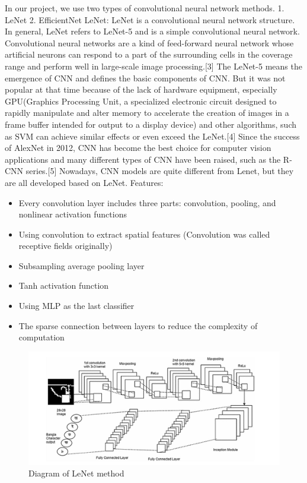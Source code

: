 \documentclass{article}
\begin{document}
In our project, we use two types of convolutional neural network methods.
1.	LeNet
2.	EfficientNet
LeNet: LeNet is a convolutional neural network structure. In general, LeNet refers to LeNet-5 and is a simple convolutional neural network. Convolutional neural networks are a kind of feed-forward neural network whose artificial neurons can respond to a part of the surrounding cells in the coverage range and perform well in large-scale image processing.[3] 
The LeNet-5 means the emergence of CNN and defines the basic components of CNN. But it was not popular at that time because of the lack of hardware equipment, especially GPU(Graphics Processing Unit, a specialized electronic circuit designed to rapidly manipulate and alter memory to accelerate the creation of images in a frame buffer intended for output to a display device) and other algorithms, such as SVM can achieve similar effects or even exceed the LeNet.[4] 
Since the success of AlexNet in 2012, CNN has become the best choice for computer vision applications and many different types of CNN have been raised, such as the R-CNN series.[5] Nowadays, CNN models are quite different from Lenet, but they are all developed based on LeNet.
Features:
\begin{itemize}
\item 	Every convolution layer includes three parts: convolution, pooling, and nonlinear activation functions
\item 	Using convolution to extract spatial features (Convolution was called receptive fields originally)
\item 	Subsampling average pooling layer
\item     Tanh activation function
\item 	Using MLP as the last classifier
\item 	The sparse connection between layers to reduce the complexity of computation
\end{itemize}


\begin{figure}
\centering
 \includegraphics{fig.PNG}
\caption{ Diagram of LeNet method }
\end{figure}
   
\end{document}
